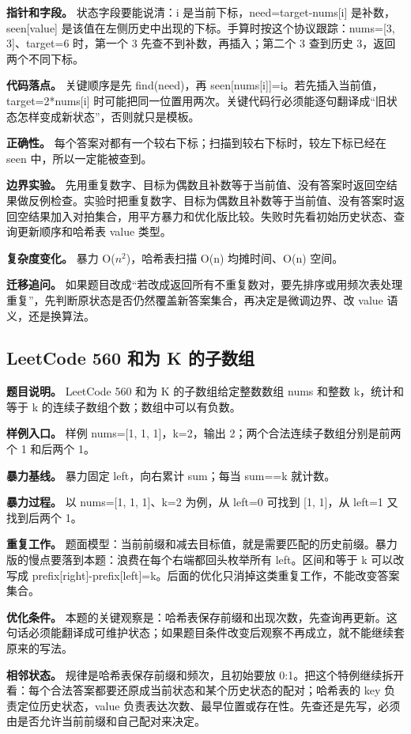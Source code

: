 \textbf{指针和字段。} 状态字段要能说清：i 是当前下标，need=target-nums[i] 是补数，seen[value] 是该值在左侧历史中出现的下标。手算时按这个协议跟踪：nums=[3, 3]、target=6 时，第一个 3 先查不到补数，再插入；第二个 3 查到历史 3，返回两个不同下标。

\textbf{代码落点。} 关键顺序是先 find(need)，再 seen[nums[i]]=i。若先插入当前值，target=2*nums[i] 时可能把同一位置用两次。关键代码行必须能逐句翻译成“旧状态怎样变成新状态”，否则就只是模板。

\textbf{正确性。} 每个答案对都有一个较右下标；扫描到较右下标时，较左下标已经在 seen 中，所以一定能被查到。

\textbf{边界实验。} 先用重复数字、目标为偶数且补数等于当前值、没有答案时返回空结果做反例检查。实验时把重复数字、目标为偶数且补数等于当前值、没有答案时返回空结果加入对拍集合，用平方暴力和优化版比较。失败时先看初始历史状态、查询更新顺序和哈希表 value 类型。

\textbf{复杂度变化。} 暴力 O(\ensuremath{n^{2}})，哈希表扫描 O(n) 均摊时间、O(n) 空间。

\textbf{迁移追问。} 如果题目改成“若改成返回所有不重复数对，要先排序或用频次表处理重复”，先判断原状态是否仍然覆盖新答案集合，再决定是微调边界、改 value 语义，还是换算法。

\subsection{LeetCode 560 和为 K 的子数组}

\textbf{题目说明。} LeetCode 560 和为 K 的子数组给定整数数组 nums 和整数 k，统计和等于 k 的连续子数组个数；数组中可以有负数。

\textbf{样例入口。} 样例 nums=[1, 1, 1]，k=2，输出 2；两个合法连续子数组分别是前两个 1 和后两个 1。

\textbf{暴力基线。} 暴力固定 left，向右累计 sum；每当 sum==k 就计数。

\textbf{暴力过程。} 以 nums=[1, 1, 1]、k=2 为例，从 left=0 可找到 [1, 1]，从 left=1 又找到后两个 1。

\textbf{重复工作。} 题面模型：当前前缀和减去目标值，就是需要匹配的历史前缀。暴力版的慢点要落到本题：浪费在每个右端都回头枚举所有 left。区间和等于 k 可以改写成 prefix[right]-prefix[left]=k。后面的优化只消掉这类重复工作，不能改变答案集合。

\textbf{优化条件。} 本题的关键观察是：哈希表保存前缀和出现次数，先查询再更新。这句话必须能翻译成可维护状态；如果题目条件改变后观察不再成立，就不能继续套原来的写法。

\textbf{相邻状态。} 规律是哈希表保存前缀和频次，且初始要放 0:1。把这个特例继续拆开看：每个合法答案都要还原成当前状态和某个历史状态的配对；哈希表的 key 负责定位历史状态，value 负责表达次数、最早位置或存在性。先查还是先写，必须由是否允许当前前缀和自己配对来决定。

